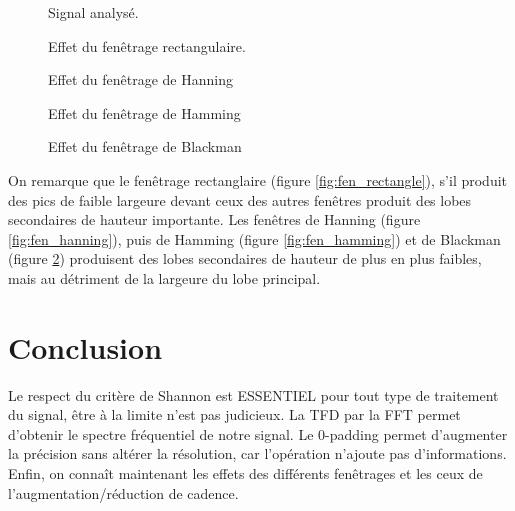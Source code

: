 \documentclass[french]{article}
\begin{document}
  
\begin{figure}[h!]
	\centering
	\begin{minipage}{\textwidth}
		\centering
		
		\caption{Signal analysé.}
		\label{fig:fen_signal}
	\end{minipage}
\end{figure}
\FloatBarrier
\begin{figure}[h!]
  	\begin{minipage}{\textwidth}
  		\centering
  		
  		\caption{Effet du fenêtrage rectangulaire.}
  		\label{fig:fen_rectangle}
  	\end{minipage}
  	\begin{minipage}{\textwidth}
  		\centering
  		
  		\caption{Effet du fenêtrage de Hanning}
  		\label{fig:fen_hanning}
	\end{minipage}
	\begin{minipage}{\textwidth}
		\centering
		
		\caption{Effet du fenêtrage de Hamming}
		\label{fig:fen_hamming}
	\end{minipage}
	\begin{minipage}{\textwidth}
		\centering
		
		\caption{Effet du fenêtrage de Blackman}
		\label{fig:fen_blackman}
	\end{minipage}
\end{figure}

On remarque que le fenêtrage rectanglaire (figure \ref{fig:fen_rectangle}), s'il produit des pics de faible largeure devant ceux des autres fenêtres produit des lobes secondaires de hauteur importante. Les fenêtres de Hanning (figure \ref{fig:fen_hanning}), puis de Hamming (figure \ref{fig:fen_hamming}) et de Blackman (figure \ref{fig:fen_blackman}) produisent des lobes secondaires de hauteur de plus en plus faibles, mais au détriment de la largeure du lobe principal.

\section*{Conclusion}
Le respect du critère de Shannon est ESSENTIEL pour tout type de traitement du signal, être à la limite n'est pas judicieux. La TFD par la FFT permet d'obtenir le spectre fréquentiel de notre signal. Le 0-padding permet d'augmenter la précision sans altérer la résolution, car l'opération n'ajoute pas d'informations. Enfin, on connaît maintenant les effets des différents fenêtrages et les ceux de l'augmentation/réduction de cadence.
\end{document}
